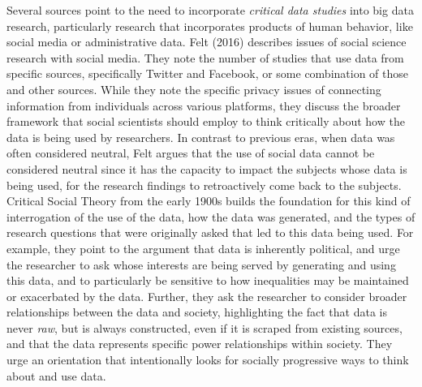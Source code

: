 \documentclass[sigconf]{acmart}
\begin{document}
Several sources point to the need to incorporate {\em critical data studies} into big data research, particularly research that incorporates products of human behavior, like social media or administrative data.  Felt (2016) describes issues of social science research with social media. \cite{felt16}  They note the number of studies that use data from specific sources, specifically Twitter and Facebook, or some combination of those and other sources.  While they note the specific privacy issues of connecting information from individuals across various platforms, they discuss the broader framework that social scientists should employ to think critically about how the data is being used by researchers.  In contrast to previous eras, when data was often considered neutral, Felt argues that the use of social data cannot be considered neutral since it has the capacity to impact the subjects whose data is being used, for the research findings to retroactively come back to the subjects.  Critical Social Theory from the early 1900s builds the foundation for this kind of interrogation of the use of the data, how the data was generated, and the types of research questions that were originally asked that led to this data being used.   For example, they point to the argument that data is inherently political, and urge the researcher to ask whose interests are being served by generating and using this data, and to particularly be sensitive to how inequalities may be maintained or exacerbated by the data.  Further, they ask the researcher to consider broader relationships between the data and society, highlighting the fact that data is never {\em raw}, but is always constructed, even if it is scraped from existing sources, and that the data represents specific power relationships within society.  They urge an orientation that intentionally looks for socially progressive ways to think about and use data.
\end{document}

